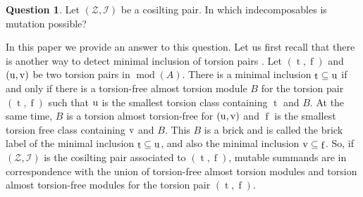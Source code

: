 \documentclass[12pt]{amsart}
\numberwithin{equation}{section}
\theoremstyle{definition}
\DeclareMathOperator{\modd}{mod}
\DeclareMathOperator{\ts}{t}
\DeclareMathOperator{\fs}{f}
\newtheorem{question}[lemma]{Question}
\newtheorem*{theorem 0*}{Theorem}
\newtheorem*{theorem a*}{Theorem A}
\newtheorem*{theorem b*}{Theorem B}
\numberwithin{diagram}{section}
\begin{document}
\begin{question}\label{1.1}
Let $(\mathcal{Z},\mathcal{I})$ be a cosilting pair. In which indecomposables is mutation possible?
\end{question}

In this paper we provide an answer to this question.
Let us first recall that there is another way to detect minimal inclusion of torsion pairs \cite{BKZ,DIRRT}. Let $(\ts,\fs)$ and $(\rm u,v)$ be two torsion pairs in $\modd(A)$. There is a minimal inclusion $\ts\subseteq \rm u$ if and only if there is a torsion-free almost torsion module $B$ for the torsion pair $(\ts,\fs)$ such that $\rm u$ is the smallest torsion class containing $\ts$ and $B$. At the same time, $B$ is a torsion almost torsion-free for $(\rm u,v)$ and $\fs$ is the smallest torsion free class containing $\rm v$ and $B$. This $B$ is a brick and is called the brick label of the minimal inclusion $\ts\subseteq\rm u$, and also the minimal inclusion $\rm v\subseteq \fs$. So, if $(\mathcal{Z},\mathcal{I})$ is the cosilting pair associated to $(\ts,\fs)$, mutable summands are in correspondence with the union of torsion-free almost torsion modules and torsion almost torsion-free modules for the torsion pair $(\ts,\fs)$.
\end{document}
